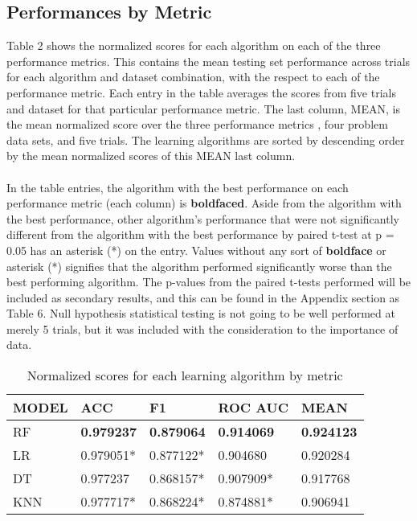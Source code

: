 \documentclass[twoside,11pt]{article}
\begin{document}
\subsection{Performances by Metric}

Table 2 shows the normalized scores for each algorithm on each of the three performance 
metrics. This contains the mean testing set performance across trials for each 
algorithm and dataset combination, with the respect to each of the performance metric. 
Each entry in the table averages the scores from five trials and dataset for that 
particular performance metric. The last column, MEAN, is the mean normalized score over the 
three performance metrics , four problem data sets, and five trials. The learning 
algorithms are sorted by descending order by the mean normalized scores of this MEAN 
last column. \\
\\
In the table entries, the algorithm with the best performance on each performance metric 
(each column) is \textbf{boldfaced}. Aside from the algorithm with the best performance, 
other algorithm's performance that were not significantly different from the algorithm 
with the best performance by paired t-test at p = 0.05 has an asterisk (*) on the entry.
Values without any sort of \textbf{boldface} or asterisk (*) signifies that the algorithm 
performed significantly worse than the best performing algorithm. The p-values from the 
paired t-tests performed will be included as secondary results, and this can be found in 
the Appendix section as Table 6. Null hypothesis statistical testing is not going to be 
well performed at merely 5 trials, but it was included with the consideration to the 
importance of data.\\
    \begin{table}[H]
    \centering
    \caption{\label{tab:Table 2.} Normalized scores for each learning algorithm by metric}
    \begin{tabular}{|l|lll|l|}
    \hline
    MODEL & ACC               & F1                & ROC AUC           & MEAN                                   \\ \hline
    RF    & \textbf{0.979237} & \textbf{0.879064} & \textbf{0.914069} & \multicolumn{1}{r|}{\textbf{0.924123}} \\
    LR    & 0.979051*         & 0.877122*         & 0.904680          & 0.920284                               \\
    DT    & 0.977237          & 0.868157*         & 0.907909*         & 0.917768                               \\
    KNN   & 0.977717*         & 0.868224*         & 0.874881*         & 0.906941                               \\ \hline
    \end{tabular}
    \end{table}
\end{document}
